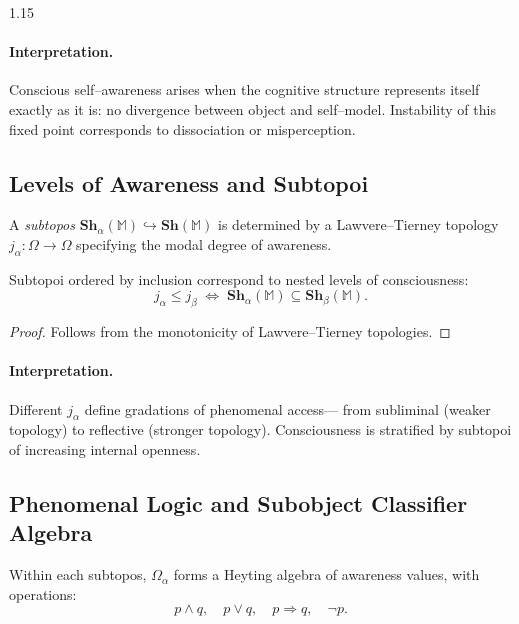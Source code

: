 \documentclass[12pt,a4paper]{article}
\begin{document}
\begin{spacing}{1.15}
\paragraph{Interpretation.}
Conscious self–awareness arises
when the cognitive structure represents itself exactly as it is:
no divergence between object and self–model.
Instability of this fixed point corresponds to dissociation or misperception.

\subsection{Levels of Awareness and Subtopoi}

\begin{definition}
\label{def:subtopos}
A \emph{subtopos}
\(\mathbf{Sh}_{\alpha}(\mathbb{M}) \hookrightarrow \mathbf{Sh}(\mathbb{M})\)
is determined by a Lawvere–Tierney topology
\(j_{\alpha}:\Omega\to\Omega\)
specifying the modal degree of awareness.
\end{definition}

\begin{proposition}
\label{prop:hier}
Subtopoi ordered by inclusion correspond
to nested levels of consciousness:
\[
  j_{\alpha}\le j_{\beta}
  \;\Longleftrightarrow\;
  \mathbf{Sh}_{\alpha}(\mathbb{M})
  \subseteq
  \mathbf{Sh}_{\beta}(\mathbb{M}).
\]
\end{proposition}

\begin{proof}
Follows from the monotonicity of Lawvere–Tierney topologies.
\end{proof}

\paragraph{Interpretation.}
Different \(j_{\alpha}\) define gradations of phenomenal access—
from subliminal (weaker topology)
to reflective (stronger topology).
Consciousness is stratified by subtopoi of increasing internal openness.

\subsection{Phenomenal Logic and Subobject Classifier Algebra}

\begin{definition}
\label{def:phenoalg}
Within each subtopos,
\(\Omega_{\alpha}\)
forms a Heyting algebra of awareness values,
with operations:
\[
  p\wedge q,\quad p\vee q,\quad p\Rightarrow q,\quad \neg p.
\]
\end{definition}


\end{spacing}
\end{document}

